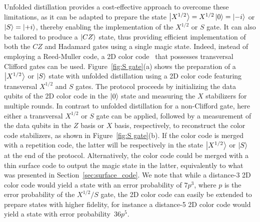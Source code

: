 \documentclass[%
 reprint,
superscriptaddress,
 amsmath,amssymb,
 aps,
]{revtex4-2}
\begin{document}
Unfolded distillation provides a cost-effective approach to overcome these limitations, as it can be adapted to prepare the state $\ket{X^{1/2}} = X^{1/2} \ket{0} = \ket{-i}$ or $\ket{S} = \ket{+i}$, thereby enabling the implementation of the $X^{1/2}$ or $S$ gate. It can also be tailored to produce a $\ket{CZ}$ state, thus providing efficient implementation of both the $CZ$ and Hadamard gates using a single magic state. Indeed, instead of employing a Reed-Muller code, a 2D color code~\cite{bombin2006topological} that possesses transversal Clifford gates can be used. Figure~\ref{fig:S gate}(a) shows the preparation of a $\ket{X^{1/2}}$ or $\ket{S}$ state with unfolded distillation using a 2D color code featuring transversal $X^{1/2}$ and $S$ gates. The protocol proceeds by initializing the data qubits of the 2D color code in the $\ket{0}$ state and measuring the $X$ stabilizers for multiple rounds. In contrast to unfolded distillation for a non-Clifford gate, here either a transversal $X^{1/2}$ or $S$ gate can be applied, followed by a measurement of the data qubits in the $Z$ basis or $X$ basis, respectively, to reconstruct the color code stabilizers, as shown in Figure~\ref{fig:S gate}(b). If the color code is merged with a repetition code, the latter will be respectively in the state $\ket{X^{1/2}}$ or $\ket{S}$ at the end of the protocol. Alternatively, the color code could be merged with a thin surface code to output the magic state in the latter, equivalently to what was presented in Section~\ref{sec:surface_code}. We note that while a distance-$3$ 2D color code would yield a state with an error probability of $7p^3$, where $p$ is the error probability of the $X^{1/2}/S$ gate, the 2D color code can easily be extended to prepare states with higher fidelity, for instance a distance-5 2D color code would yield a state with error probability~$36p^5$.
\end{document}
